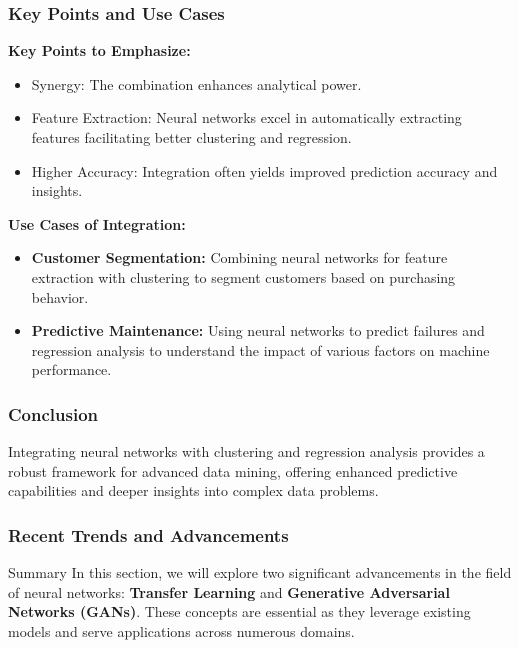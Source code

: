 \documentclass[aspectratio=169]{beamer}
\begin{document}
\begin{frame}[fragile]
    \frametitle{Key Points and Use Cases}
    \textbf{Key Points to Emphasize:}
    \begin{itemize}
        \item Synergy: The combination enhances analytical power.
        \item Feature Extraction: Neural networks excel in automatically extracting features facilitating better clustering and regression.
        \item Higher Accuracy: Integration often yields improved prediction accuracy and insights.
    \end{itemize}

    \textbf{Use Cases of Integration:}
    \begin{itemize}
        \item \textbf{Customer Segmentation:} Combining neural networks for feature extraction with clustering to segment customers based on purchasing behavior.
        \item \textbf{Predictive Maintenance:} Using neural networks to predict failures and regression analysis to understand the impact of various factors on machine performance.
    \end{itemize}
\end{frame}

\begin{frame}[fragile]
    \frametitle{Conclusion}
    Integrating neural networks with clustering and regression analysis provides a robust framework for advanced data mining, offering enhanced predictive capabilities and deeper insights into complex data problems.
\end{frame}

\begin{frame}[fragile]
    \frametitle{Recent Trends and Advancements}
    \begin{block}{Summary}
        In this section, we will explore two significant advancements in the field of neural networks: \textbf{Transfer Learning} and \textbf{Generative Adversarial Networks (GANs)}.
        These concepts are essential as they leverage existing models and serve applications across numerous domains.
    \end{block}
\end{frame}
\end{document}
